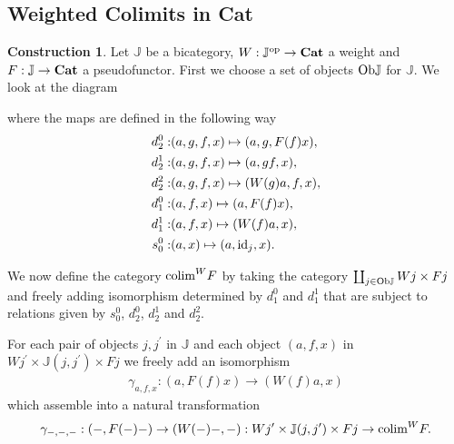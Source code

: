 \documentclass[12pt,oneside,reqno,a4paper]{article}
\theoremstyle{definition}
\newtheorem{construction}[theorem]{Construction}
\newcommand{\op}{^\textup{op}}
\newcommand{\Ob}{\textup{Ob}}
\newcommand{\Cat}{\textbf{\textup{Cat}}}
\newcommand{\id}{\textup{id}}
\newcommand{\bJ}{\mathbb{J}}
\newcommand{\p}{^\prime}
\newcommand{\pp}{^{\prime\prime}}
\newcommand{\colim}{\textup{colim}}
\begin{document}
\subsection{Weighted Colimits in \textbf{Cat}} \label{app1}

\begin{construction} \label{const}
Let $\bJ$ be a bicategory, $W:\bJ\op\to\Cat$ a weight and $F:\bJ\to\Cat$ a pseudofunctor. First we choose a set of objects $\Ob\bJ$ for $\bJ$. We look at the diagram
\begin{center}
\vspace*{-\baselineskip}
\hspace*{-24pt}
\end{center}
where the maps are defined in the following way
\begin{align*}
d_2^0: & (a,g,f,x) \mapsto (a,g,F(f)x), \\
d_2^1: & (a,g,f,x) \mapsto (a,gf,x), \\
d_2^2: & (a,g,f,x) \mapsto (W(g)a,f,x), \\
d_1^0: & (a,f,x) \mapsto (a,F(f)x), \\
d_1^1: & (a,f,x) \mapsto (W(f)a,x), \\
s_0^0: & (a,x) \mapsto (a,\id_j,x).
\end{align*}

We now define the category $\colim^W F$ by taking the category $\coprod_{j \in \Ob\bJ}Wj\times Fj$ and freely adding isomorphism determined by $d^0_1$ and $d^1_1$ that are subject to relations given by $s^0_0$, $d^0_2$, $d^1_2$ and $d^2_2$.

For each pair of objects $j,j\p$ in $\bJ$ and each object $(a,f,x)$ in $Wj\p\times\bJ(j,j\p)\times Fj$ we freely add an isomorphism 
\begin{align*}
\gamma_{a,f,x}: (a,F(f)x)\to (W(f)a,x)
\end{align*}
which assemble into a natural transformation
\begin{align*}
\gamma_{-,-,-}: (-,F(-)-) \to (W(-)-,-): Wj\p\times \bJ(j,j\p) \times Fj \to \colim^W F.
\end{align*}


\end{construction}
\end{document}
